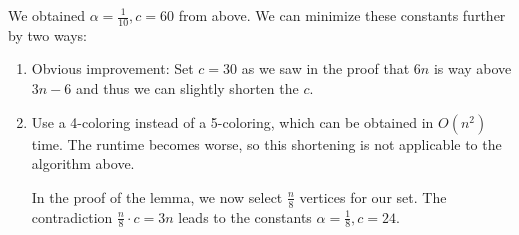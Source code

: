 \documentclass[10pt]{article}
\theoremstyle{definition}
\newtheorem{lemma}{Lemma}
\theoremstyle{remark}
\begin{document}
We obtained \(\alpha = \frac{1}{10}, c = 60\) from above. We can minimize these constants further by two ways:

\begin{enumerate}
    \item Obvious improvement: Set \(c = 30\) as we saw in the proof that \(6n\) is way above \(3n-6\) and thus we can slightly shorten the \(c\).
    \item Use a 4-coloring instead of a 5-coloring, which can be obtained in \(O(n^2)\) time. The runtime becomes worse, so this shortening is not applicable to the algorithm above.

    In the proof of the lemma, we now select \(\frac{n}{8}\) vertices for our set. The contradiction \(\frac{n}{8} \cdot c = 3n\) leads to the constants \(\alpha = \frac{1}{8}, c = 24\).
\end{enumerate}
\end{document}
